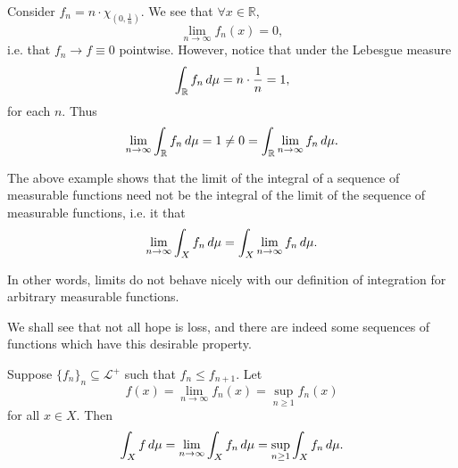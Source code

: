 \documentclass[notoc,notitlepage]{tufte-book}
\begin{document}
\begin{eg}\label{eg:fatou_s_lemma_strict_inequality}
  Consider $f_n = n \cdot \chi_{\left( 0, \frac{1}{n} \right)}$.
  We see that $\forall x \in \mathbb{R}$,
  \begin{equation*}
    \lim_{n \to \infty} f_n(x) = 0,
  \end{equation*}
  i.e. that $f_n \to f \equiv 0$ pointwise.
  However, notice that under the Lebesgue measure
  \begin{equation*}
    \int_{\mathbb{R}} f_n \mathop{}\!d{\mu} = n \cdot \frac{1}{n} = 1,
  \end{equation*}
  for each $n$.
  Thus
  \begin{equation*}
    \lim_{n \to \infty} \int_{\mathbb{R}} f_n \mathop{}\!d{\mu}
    = 1 \neq 0
    = \int_{\mathbb{R}} \lim_{n \to \infty} f_n \mathop{}\!d{\mu}.
  \end{equation*}
\end{eg}

\begin{warning}
  The above example shows that the limit of the integral of a sequence of
  measurable functions need not be the integral of the limit of the sequence
  of measurable functions,
  i.e.  it  that
  \begin{equation*}
    \lim_{n \to \infty} \int_{X} f_n \mathop{}\!d{\mu}
    = \int_{X} \lim_{n \to \infty} f_n \mathop{}\!d{\mu}.
  \end{equation*}

  In other words, limits do not behave nicely with our definition of
  integration for arbitrary measurable functions.
\end{warning}

We shall see that not all hope is loss,
and there are indeed some sequences of functions
which have this desirable property.

\begin{thm}\label{thm:monotone_convergence_theorem}
  Suppose $\{ f_n \}_n \subseteq \mathcal{L}^+$ such that $f_n \leq f_{n+1}$.
  Let
  \begin{equation*}
    f(x) = \lim_{n \to \infty} f_n(x) = \sup_{n \geq 1} f_n(x)
  \end{equation*}
  for all $x \in X$.
  Then
  \begin{equation*}
    \int_{X} f \mathop{}\!d{\mu}
    = \lim_{n \to \infty} \int_{X} f_n \mathop{}\!d{\mu}
    = \sup_{n \geq 1} \int_{X} f_n \mathop{}\!d{\mu}.
  \end{equation*}
\end{thm}
\end{document}
